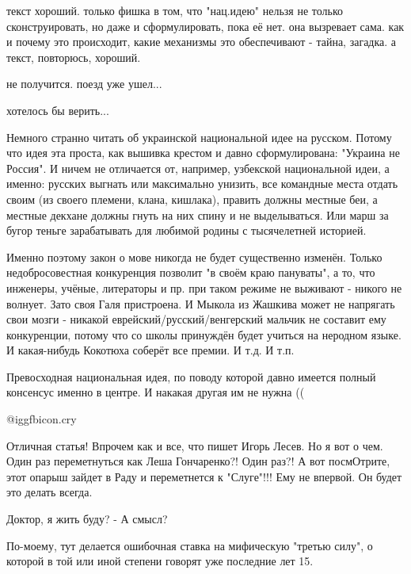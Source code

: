 \begin{itemize}
текст хороший.
только фишка в том, что "нац.идею" нельзя не только сконструировать, но даже и сформулировать, пока её нет.
она вызревает сама.
как и почему это происходит, какие механизмы это обеспечивают - тайна, загадка.
а текст, повторюсь, хороший.

не получится. поезд уже ушел...

хотелось бы верить...


Немного странно читать об украинской национальной идее на русском. Потому что
идея эта проста, как вышивка крестом и давно сформулирована: "Украина не
Россия". И ничем не отличается от, например, узбекской национальной идеи, а
именно: русских выгнать или максимально унизить, все командные места отдать
своим (из своего племени, клана, кишлака), править должны местные беи, а
местные декхане должны гнуть на них спину и не выделываться. Или марш за бугор
теньге зарабатывать для любимой родины с тысячелетней историей.

Именно поэтому закон о мове никогда не будет существенно изменён. Только
недобросовестная конкуренция позволит "в своём краю пануваты", а то, что
инженеры, учёные, литераторы и пр. при таком режиме не выживают - никого не
волнует. Зато своя Галя пристроена. И Мыкола из Жашкива может не напрягать свои
мозги - никакой еврейский/русский/венгерский мальчик не составит ему
конкуренции, потому что со школы принуждён будет учиться на неродном языке. И
какая-нибудь Кокотюха соберёт все премии. И т.д. И т.п.

Превосходная национальная идея, по поводу которой давно имеется полный
консенсус именно в центре. И накакая другая им не нужна ((

\begin{itemize} %
 @igg{fbicon.cry} 
\end{itemize} %


Отличная статья! Впрочем как и все, что пишет Игорь Лесев. Но я вот о чем. Один
раз переметнуться как Леша Гончаренко?! Один раз?! А вот посмОтрите, этот
опарыш зайдет в Раду и переметнется к "Слуге"!!! Ему не впервой. Он будет это
делать всегда.

Доктор, я жить буду? - А смысл?


По-моему, тут делается ошибочная ставка на мифическую "третью силу", о которой
в той или иной степени говорят уже последние лет 15.


\end{itemize}
